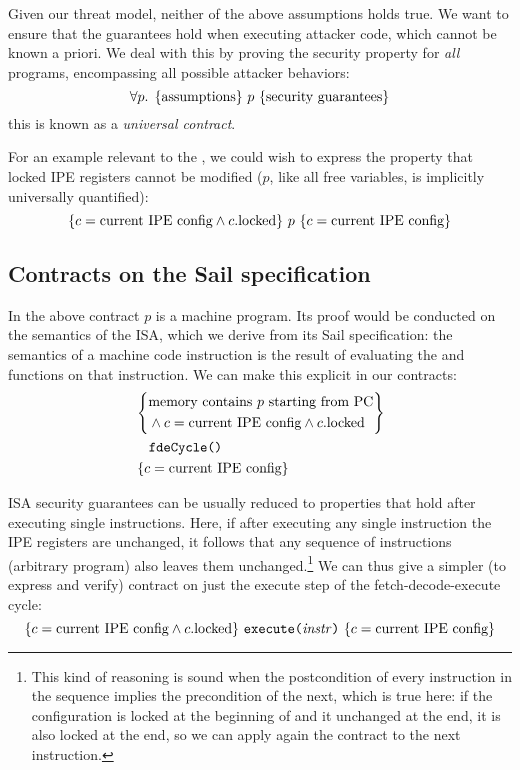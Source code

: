 Given our threat model, neither of the above assumptions holds true. We want to ensure that the guarantees hold when executing attacker code, which cannot be known a priori. We deal with this by proving the security property for \emph{all} programs, encompassing all possible attacker behaviors:
\[ \forall p.\; \hoare{\text{assumptions}}{p}{\text{security guarantees}} \]
this is known as a \emph{universal contract}.

For an example relevant to the \msp, we could wish to express the property that locked IPE registers cannot be modified (\(p\), like all free variables, is implicitly universally quantified):
\[ \hoare
  {c = \text{current IPE config} \wedge c.\mathrm{locked}}
  {p}
  {c = \text{current IPE config}} \]

\subsection{Contracts on the Sail specification}

In the above contract \(p\) is a \msp machine program. Its proof would be conducted on the semantics of the \msp ISA, which we derive from its Sail specification: the semantics of a machine code instruction is the result of evaluating the  and  functions on that instruction. We can make this explicit in our contracts:
\[ \hoarem
  {\begin{aligned}
    &\text{memory contains \(p\) starting from PC} \\
    &{}\wedge c = \text{current IPE config} \wedge c.\mathrm{locked}
  \end{aligned}}
  {\texttt{fdeCycle()}}
  {c = \text{current IPE config}} \]

ISA security guarantees can be usually reduced to properties that hold after executing single instructions. Here, if after executing any single instruction the IPE registers are unchanged, it follows that any sequence of instructions (\ie arbitrary program) also leaves them unchanged.\footnote{This kind of reasoning is sound when the postcondition of every instruction in the sequence implies the precondition of the next, which is true here: if the configuration is locked at the beginning of  and it unchanged at the end, it is also locked at the end, so we can apply again the contract to the next instruction.} We can thus give a simpler (to express and verify) contract on just the execute step of the fetch-decode-execute cycle:
\[ \hoare
  {c = \text{current IPE config} \wedge c.\mathrm{locked}}
  {\texttt{execute(\(\mathit{instr}\))}}
  {c = \text{current IPE config}} \]

